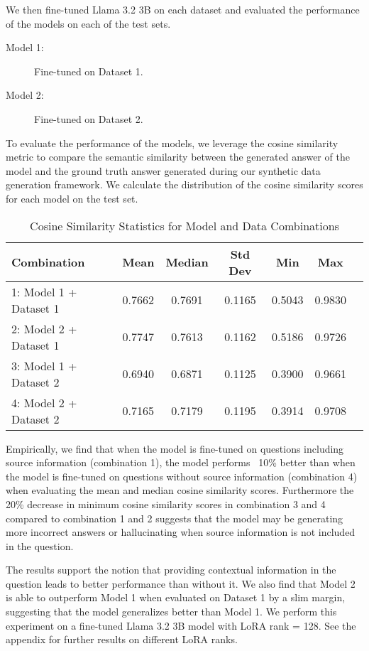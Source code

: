 We then fine-tuned Llama 3.2 3B on each dataset and evaluated the performance of the models on each of the 
test sets. 
\begin{description}
    \item[Model 1:] Fine-tuned on Dataset 1.
    \item[Model 2:] Fine-tuned on Dataset 2.
\end{description}

To evaluate the performance of the models, we leverage the cosine similarity metric to compare the semantic similarity
between the generated answer of the model and the ground truth answer generated during our synthetic data generation framework. 
We calculate the distribution of the cosine similarity scores for each model on the test set.

\begin{table}[h!]
\centering
\caption{Cosine Similarity Statistics for Model and Data Combinations}
\label{tab:cosine_similarity}
\begin{tabular}{lcccccc}
\hline
\textbf{Combination} & \textbf{Mean} & \textbf{Median} & \textbf{Std Dev} & \textbf{Min} & \textbf{Max} \\
\hline
1: Model 1 + Dataset 1 & 0.7662 & 0.7691 & 0.1165 & 0.5043 & 0.9830 \\
2: Model 2 + Dataset 1 & 0.7747 & 0.7613 & 0.1162 & 0.5186 & 0.9726 \\
3: Model 1 + Dataset 2 & 0.6940 & 0.6871 & 0.1125 & 0.3900 & 0.9661 \\
4: Model 2 + Dataset 2 & 0.7165 & 0.7179 & 0.1195 & 0.3914 & 0.9708 \\
\hline
\end{tabular}
\end{table}

Empirically, we find that when the model is fine-tuned on questions including source information (combination 1), 
the model performs ~10\% better than when the model is fine-tuned on questions without source information (combination 4)
when evaluating the mean and median cosine similarity scores. Furthermore the 20\% decrease in minimum cosine 
similarity scores in combination 3 and 4 compared to combination 1 and 2 suggests that the model may be generating 
more incorrect answers or hallucinating when source information is not included in the question.

The results support the notion that providing contextual information in the question leads to better performance than without it. 
We also find that Model 2 is able to outperform Model 1 when evaluated on Dataset 1 by a slim margin, 
suggesting that the model generalizes better than Model 1. We perform this experiment on a fine-tuned Llama 3.2 3B model with 
LoRA rank = 128. See the appendix for further results on different LoRA ranks.

